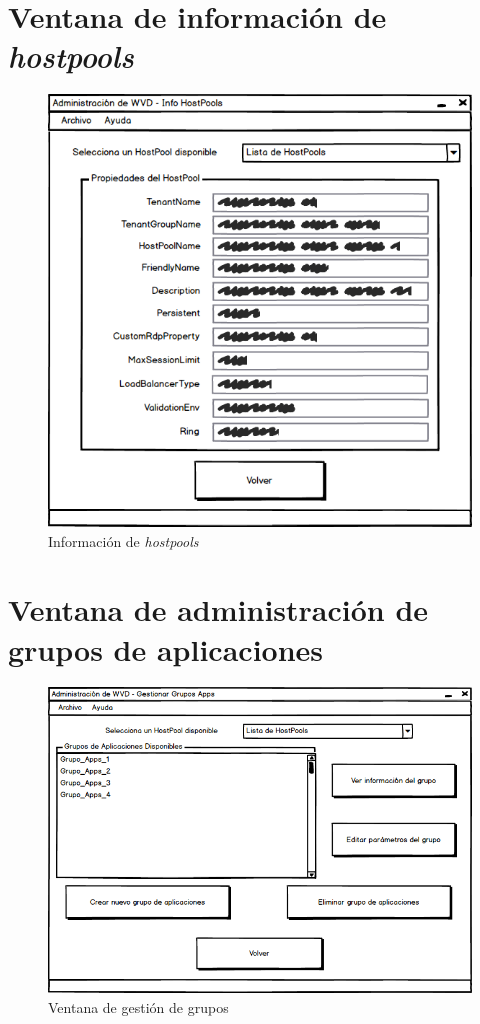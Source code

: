 \section{Ventana de información de \textit{hostpools}}

\begin{figure}[h]
  \centering
  \includegraphics[width=0.6\linewidth]{figures/images/bocetos/info_hostpools.png}
  \caption{Información de \textit{hostpools}}
  \label{fig:b_infohostpools}
\end{figure}

\clearpage

\section{Ventana de administración de grupos de aplicaciones}

\begin{figure}[h]
  \centering
  \includegraphics[width=0.9\linewidth]{figures/images/bocetos/ventana_gestion.png}
  \caption{Ventana de gestión de grupos}
  \label{fig:b_admingrupos}
\end{figure}

